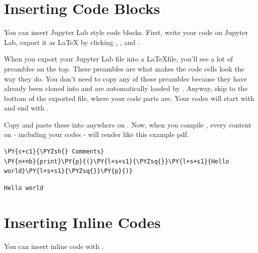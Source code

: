 \section*{Inserting Code Blocks}
 
You can insert Jupyter Lab style code blocks.
First, write your code on Jupyter Lab, export it as LaTeX
by clicking , ,
and .

When you export your Jupyter Lab file into a \LaTeX file,
you'll see a lot of preambles on the top. These preambles
are what makes the code cells look 
the way they do. You don't
need to copy any of those preambles because they have already
been cloned into  and are
automatically loaded by . 
Anyway, skip to the bottom of the exported file, where
your code parts are. Your codes will start with
 and end with .

Copy and paste these into anywhere on .
Now, when you compile , every content
on  - including your codes - will render like this example pdf.

    \begin{tcolorbox}[breakable, size=fbox, boxrule=1pt, pad at break*=1mm,colback=cellbackground, colframe=cellborder]
\begin{Verbatim}[commandchars=\\\{\}]
\PY{c+c1}{\PYZsh{} Comments}
\PY{n+nb}{print}\PY{p}{(}\PY{l+s+s1}{\PYZsq{}}\PY{l+s+s1}{Hello world}\PY{l+s+s1}{\PYZsq{}}\PY{p}{)}
\end{Verbatim}
\end{tcolorbox}

    \begin{Verbatim}[commandchars=\\\{\}]
Hello world
    \end{Verbatim}

\section*{Inserting Inline Codes}
\noindent You can insert inline code with
.



